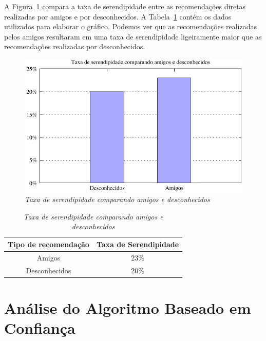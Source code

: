 A Figura~\ref{fig:serendipidade_diretas} compara a taxa de serendipidade entre as recomendações diretas realizadas por amigos e por desconhecidos. A Tabela~\ref{table:serendipidade_diretas} contém os dados utilizados para elaborar o gráfico. Podemos ver que as recomendações realizadas pelos amigos resultaram em uma taxa de serendipidade ligeiramente maior que as recomendações realizadas por desconhecidos.

\begin{figure}
    \centering
    \includegraphics[width=\textwidth]{imagens/grafico_serendipidade_diretas}
    \caption{\it Taxa de serendipidade comparando amigos e desconhecidos}
    \label{fig:serendipidade_diretas}
\end{figure}

\begin{table}
\centering
\begin{tabular}{c c}
    \hline \hline
    \textbf{Tipo de recomendação} & \textbf{Taxa de Serendipidade} \\
\hline 
Amigos & 23\% \\
\hline 
Desconhecidos & 20\% \\
\hline        
\end{tabular}
\caption{\it Taxa de serendipidade comparando amigos e desconhecidos}
\label{table:serendipidade_diretas}
\end{table}


\section{Análise do Algoritmo Baseado em Confiança}
\label{sec:analise_do_algoritmo_baseado_em_confianca}

